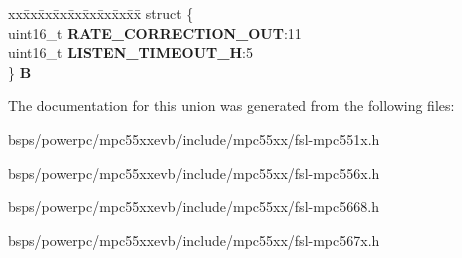 \begin{DoxyCompactItemize}
\begin{tabbing}
\end{tabbing}\item 
\mbox{\label{unionuPCR14_a0b5532f569adbcef80cad6ad819a71da}} 
\begin{tabbing}
xx\=xx\=xx\=xx\=xx\=xx\=xx\=xx\=xx\=\kill
struct \{\\
\>uint16\_t {\bfseries RATE\_CORRECTION\_OUT}:11\\
\>uint16\_t {\bfseries LISTEN\_TIMEOUT\_H}:5\\
\} {\bfseries B}\\

\end{tabbing}\end{DoxyCompactItemize}


The documentation for this union was generated from the following files\+:\begin{DoxyCompactItemize}
\item 
bsps/powerpc/mpc55xxevb/include/mpc55xx/fsl-\/mpc551x.\+h\item 
bsps/powerpc/mpc55xxevb/include/mpc55xx/fsl-\/mpc556x.\+h\item 
bsps/powerpc/mpc55xxevb/include/mpc55xx/fsl-\/mpc5668.\+h\item 
bsps/powerpc/mpc55xxevb/include/mpc55xx/fsl-\/mpc567x.\+h\end{DoxyCompactItemize}
